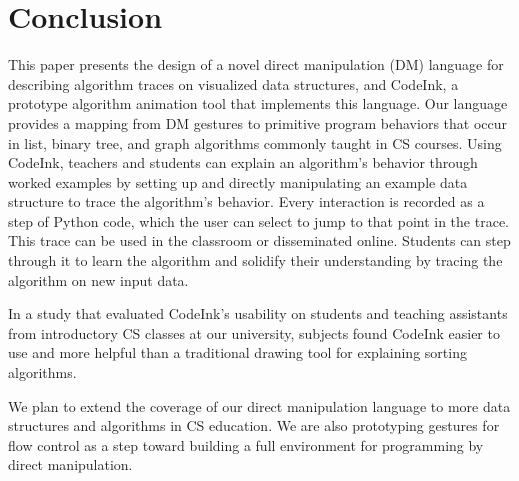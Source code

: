 \section{Conclusion}

This paper presents the design of a novel direct manipulation (DM)
language for describing algorithm traces on visualized data structures,
and CodeInk, a prototype algorithm animation tool that implements this
language. Our language provides a mapping from DM gestures to primitive
program behaviors that occur in list, binary tree, and graph algorithms
commonly taught in CS courses. Using CodeInk, teachers and students can
explain an algorithm's behavior through worked examples by setting up
and directly manipulating an example data structure to trace the
algorithm's behavior. Every interaction is recorded as a step of Python
code, which the user can select to jump to that point in the trace.
%
This trace can be used in the classroom or disseminated online. Students
can step through it to learn the algorithm and solidify their
understanding by tracing the algorithm on new input data.

In a study that evaluated CodeInk's usability on students and teaching
assistants from introductory CS classes at our university, subjects found CodeInk
easier to use and more helpful than a traditional drawing tool for
explaining sorting algorithms.

We plan to extend the coverage of our direct manipulation language to
more data structures and algorithms in CS education. We are also
prototyping gestures for flow control as a step toward building a full
environment for programming by direct manipulation.
